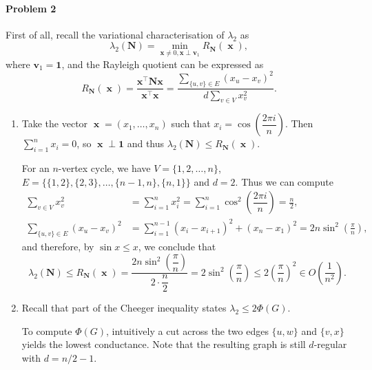 \documentclass[12pt]{article}
\DeclareMathOperator{\xb}{\mathbf{x}}
\newcommand\mb{\mathbf}
\begin{document}
\paragraph{Problem 2}
First of all, recall the variational characterisation of $\lambda_2$ as
$$\lambda_2(\mathbf{N})=\min_{\mathbf{x}\ne0,\mathbf{x}\perp\mathbf{v}_1}R_{\mathbf{N}}(\xb),$$
where $\mb{v}_1=\mb{1}$, and the Rayleigh quotient can be expressed as
$$R_{\mathbf{N}}(\xb)=\frac{\mathbf{x}^\top\mathbf{N}\mathbf{x}}{\mathbf{x}^\top\mathbf{x}}=\frac{\sum_{\{u,v\}\in E}(x_u-x_v)^2}{d\sum_{v\in V}x_v^2}.$$
\begin{enumerate}
\item
Take the vector $\xb=(x_1, \dots,x_n)$ such that $x_i=\cos\left(\dfrac{2\pi i}{n}\right)$. Then $\displaystyle\sum_{i=1}^n x_i=0$, so $\xb\perp\mathbf{1}$ and thus $\lambda_2(\mathbf{N})\le R_{\mathbf{N}}(\xb)$.

For an $n$-vertex cycle, we have $V=\{1,2,\dots,n\}$, $E=\{\{1,2\},\{2,3\},\dots,\{n-1,n\},\{n,1\}\}$ and $d=2$. Thus we can compute
\begin{align*}
\sum_{v\in V} x_v^2&=\sum_{i=1}^n x_i^2=\sum_{i=1}^n\cos^2\left(\dfrac{2\pi i}{n}\right)=\frac{n}{2},\\
\sum_{\{u,v\}\in E}(x_u-x_v)^2&=\sum_{i=1}^{n-1} (x_i-x_{i+1})^2+(x_n-x_1)^2=2n\sin^2\left(\frac\pi n\right),
\end{align*}
and therefore, by $\sin x\le x$, we conclude that
$$\lambda_2(\mathbf{N})\le R_{\mathbf{N}}(\xb)=\frac{2n\sin^2\left(\dfrac\pi n\right)}{2\cdot\dfrac{n}{2}}=2\sin^2\left(\dfrac\pi n\right)\le2\left(\dfrac\pi n\right)^2\in O\left(\frac 1 {n^2}\right).$$
\item
Recall that part of the Cheeger inequality states $\lambda_2\le2\Phi(G)$.

To compute $\Phi(G)$, intuitively a cut across the two edges $\{u,w\}$ and $\{v,x\}$ yields the lowest conductance. Note that the resulting graph is still $d$-regular with $d=n/2-1$.


\end{enumerate}
\end{document}
